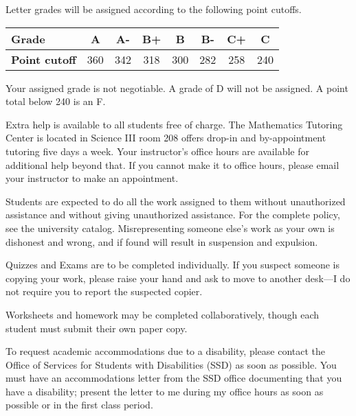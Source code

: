 \documentclass[10pt, letterpaper]{letter}
\begin{document}

Letter grades will be assigned according to the following point cutoffs.

\begin{tabular}{l|c|c|c|c|c|c|c}
    \textbf{Grade}        & A   & A-  & B+  & B   & B-  & C+  & C   \\
    \hline
    \textbf{Point cutoff} & 360 & 342 & 318 & 300 & 282 & 258 & 240 \\
\end{tabular}

Your assigned grade is not negotiable. A grade of D will not be
assigned. A point total below 240 is an F.


Extra help is available to all students free of charge. The Mathematics
Tutoring Center is located in Science III room 208 offers drop-in and
by-appointment tutoring five days a week. Your instructor's office hours
are available for additional help beyond that. If you cannot make it to
office hours, please email your instructor to make an appointment.


Students are expected to do all the work assigned to them without
unauthorized assistance and without giving unauthorized assistance. For
the complete policy, see the university catalog. Misrepresenting
someone else's work as your own is dishonest and wrong, and if found
will result in suspension and expulsion.

Quizzes and Exams are to be completed individually. If you suspect
someone is copying your work, please raise your hand and ask to move to
another desk---I do not require you to report the suspected copier.

Worksheets and homework may be completed collaboratively, though each
student must submit their own paper copy.


To request academic accommodations due to a disability, please contact
the Office of Services for Students with Disabilities (SSD) as soon as
possible. You must have an accommodations letter from the SSD office
documenting that you have a disability; present the letter to me during
my office hours as soon as possible or in the first class period.
\end{document}
